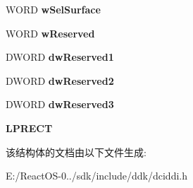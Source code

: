 \begin{DoxyCompactItemize}
\mbox{\label{struct___d_c_i_s_u_r_f_a_c_e_i_n_f_o_aadd0e38fbb979c8221bc39187063620d}} 
W\+O\+RD {\bfseries w\+Sel\+Surface}
\item 
\mbox{\label{struct___d_c_i_s_u_r_f_a_c_e_i_n_f_o_ade77b945ee8cbe1bdfd288ce7605c7f1}} 
W\+O\+RD {\bfseries w\+Reserved}
\item 
\mbox{\label{struct___d_c_i_s_u_r_f_a_c_e_i_n_f_o_acad1827259faf2e159df19f385593dfd}} 
D\+W\+O\+RD {\bfseries dw\+Reserved1}
\item 
\mbox{\label{struct___d_c_i_s_u_r_f_a_c_e_i_n_f_o_a2fb96481f954de35eccc6df826abf1c7}} 
D\+W\+O\+RD {\bfseries dw\+Reserved2}
\item 
\mbox{\label{struct___d_c_i_s_u_r_f_a_c_e_i_n_f_o_aee991abeb2e92e368d1a61e87dcf9521}} 
D\+W\+O\+RD {\bfseries dw\+Reserved3}
\item 
\mbox{\label{struct___d_c_i_s_u_r_f_a_c_e_i_n_f_o_a1f16e4831ea39dcc8c34242df2694d62}} 
{\bfseries L\+P\+R\+E\+CT}
\end{DoxyCompactItemize}


该结构体的文档由以下文件生成\+:\begin{DoxyCompactItemize}
\item 
E\+:/\+React\+O\+S-\/0../sdk/include/ddk/dciddi.\+h\end{DoxyCompactItemize}
